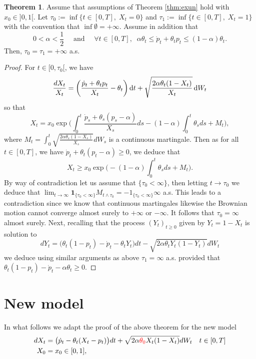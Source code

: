 \documentclass[11pt]{article}
\theoremstyle{definition}
\newtheorem{Thm}[Def]{Theorem}
\newcommand{\red}{\textcolor{red}}
\begin{document}
\begin{Thm}
Assume that assumptions of Theorem \ref{thm:exun} hold with $x_0\in]0,1[$.
Let $\tau_0:=\inf \{t\in[0,T],\; X_t=0\}$ and  $\tau_1:=\inf \{t\in[0,T],\; X_t=1\}$ with the convention that $\inf\emptyset=+\infty$. Assume in addition that
\begin{equation}\label{Assumption:2}
0<\alpha < \frac 12\quad \mbox{ and }\quad \forall  t\in[0,T],\;\; \alpha\theta_t\le \dot p_t +\theta_tp_t \le (1-\alpha)\theta_t \tag{B}. 
\end{equation}
 Then, $\tau_0=\tau_1=+\infty$ a.s.
\end{Thm}
\begin{proof}
For $t\in[0,\tau_0[$, we have 
$$
\frac{dX_t}{X_t}=\left( \frac{\dot p_t +\theta_t p_t}{X_t} - \theta_t\right)\dif t  +\sqrt{\frac{2\alpha \theta_t(1-X_t)}{X_t}} \dif W_t 
$$  
so that
$$
X_t=x_0\exp\Big(\int_0^t \frac{\dot p_s +\theta_s(p_s-\alpha)}{X_s}ds-(1-\alpha)\int_0^t\theta_sds + M_t\Big),
$$
where $M_t=\int_0^t\sqrt{\frac{2\alpha \theta_s(1-X_s)}{X_s}} dW_s$ is a continuous martingale. Then as for all $t\in[0,T]$, we have $\dot p_t +\theta_t(p_t-\alpha)\ge0$, we deduce that
$$
X_t\ge x_0\exp\Big(-(1-\alpha)\int_0^t\theta_sds + M_t\Big).
$$
By way of contradiction let us assume that  $\{\tau_0<\infty\}$, then letting $t\to \tau_0$ we deduce that $\lim_{t\to \infty} \mathbf 1_{\{\tau_0<\infty\}}M_{t\wedge \tau_0}=\mathbf -1_{\{\tau_0<\infty\}}\infty$ a.s. This leads to a contradiction since we know that continuous martingales likewise the Brownian motion cannot converge  almost surely to $+\infty$ or $-\infty$. It follows that $\tau_0=\infty$ almost surely. Next, recalling that  the process $(Y_t)_{t\geq 0}$  given by $Y_t=1-X_t$ is solution to 
$$
dY_t= \big( \theta_t(1-p_t) -\dot p_t - \theta_tY_t  \big)dt  -\sqrt{2\alpha \theta_tY_t(1-Y_t)} dW_t 
$$
we deduce using similar arguments as above 
$\tau_1=\infty$ a.s. provided that $\theta_t(1-p_t) -\dot p_t -\alpha \theta_t\ge 0$.
\end{proof}

\section{New model}
In what follows we adapt the proof of the above theorem for the new model 
\begin{align}\label{eq:model2}
dX_t&= \big(\dot p_t - \theta_t(X_t-p_t)  \big)dt  +\sqrt{2\alpha \red{\theta_0}X_t(1-X_t)} dW_t\quad t\in[0,T]\\
X_0&=x_0\in[0,1],\notag
\end{align}
\end{document}
